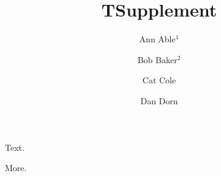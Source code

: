 \documentclass{llncs}
\begin{document}
\title{T}
\author{Ann Able$^{1}$ \and Bob Baker$^{2}$}
\maketitle
Text.
\title{Supplement}
\author{Cat Cole \and Dan Dorn}
\maketitle
More.
\end{document}
